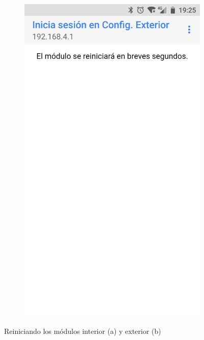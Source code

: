 \begin{figure}
\begin{subfigure}{0.49\columnwidth}
  \includegraphics[width=1\columnwidth,frame]{images/exterior-restart}
  \caption{}
  \label{fig:exterior-restart}
\end{subfigure}
\caption{Reiniciando los módulos interior (a) y exterior (b)}
\end{figure}

